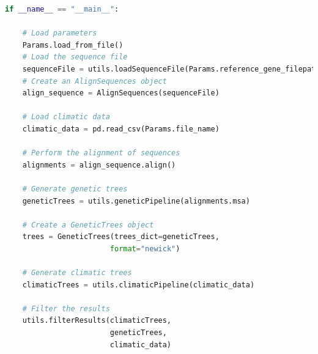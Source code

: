 \begin{lstlisting}[label=lst:main,language=Python,caption=Main script for tutorial using the aPhyloGeo package.]
if __name__ == "__main__":

    # Load parameters
    Params.load_from_file()
    # Load the sequence file
    sequenceFile = utils.loadSequenceFile(Params.reference_gene_filepath)
    # Create an AlignSequences object
    align_sequence = AlignSequences(sequenceFile)

    # Load climatic data 
    climatic_data = pd.read_csv(Params.file_name)

    # Perform the alignment of sequences
    alignments = align_sequence.align()

    # Generate genetic trees
    geneticTrees = utils.geneticPipeline(alignments.msa)
    
    # Create a GeneticTrees object
    trees = GeneticTrees(trees_dict=geneticTrees, 
                        format="newick")
   
    # Generate climatic trees
    climaticTrees = utils.climaticPipeline(climatic_data)
    
    # Filter the results
    utils.filterResults(climaticTrees, 
                        geneticTrees, 
                        climatic_data)

\end{lstlisting}

